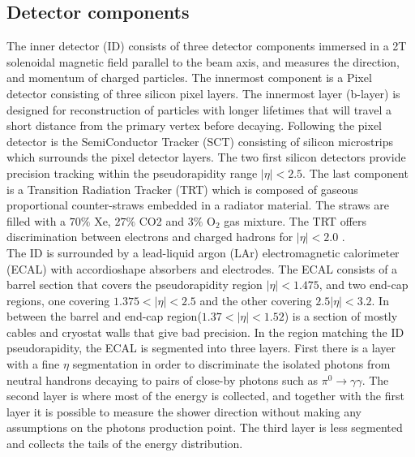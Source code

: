 \documentclass[10pt, aps, twocolumn, a4paper, nofootinbib]{revtex4}
\begin{document}
\subsection{Detector components\label{sec:ATLAS_detector_components}}
The inner detector (ID)\citep{ID2012} consists of three detector components immersed in a 2T solenoidal magnetic field parallel to the beam axis, and measures the direction, and momentum of charged particles. The innermost component is a Pixel detector consisting of three silicon pixel layers. The innermost layer (b-layer) is designed for reconstruction of particles with longer lifetimes that will travel a short distance from the primary vertex before decaying. Following the pixel detector is the SemiConductor Tracker (SCT) consisting of silicon microstrips which surrounds the pixel detector layers. The two first silicon detectors provide precision tracking within the pseudorapidity range $|\eta| < 2.5$. The last component is a Transition Radiation Tracker (TRT) which is composed of gaseous proportional counter-straws embedded in a radiator material. The straws are filled with a $70\%$ Xe, $27\%$ CO2 and $3\%$ O$_2$ gas mixture. The TRT offers discrimination between electrons and charged hadrons for $|\eta|<2.0$ \citep{MeasureHiggs13TeV}.\\

The ID is surrounded by a lead-liquid argon (LAr) electromagnetic calorimeter (ECAL) with accordioshape absorbers and electrodes. The ECAL consists of a barrel section that covers the pseudorapidity region $|\eta| < 1.475$, and two end-cap regions, one covering $1.375 < |\eta| < 2.5$ and the other covering $2.5 |\eta|< 3.2$. In between the barrel and end-cap region($1.37 <|\eta|<1.52$) is a section of mostly cables and cryostat walls that give bad precision. In the region matching the ID pseudorapidity, the ECAL is segmented into three layers. First there is a layer with a fine $\eta$ segmentation in order to discriminate the isolated photons from neutral handrons decaying to pairs of close-by photons such as $\pi^0\rightarrow \gamma\gamma$. The second layer is where most of the energy is collected, and together with the first layer it is possible to measure the shower direction without making any assumptions on the photons production point. The third layer is less segmented and collects the tails of the energy distribution.\\
\end{document}
